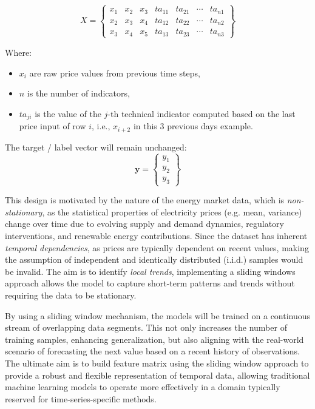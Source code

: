 \documentclass[12pt]{report} %
\begin{document}
\begin{equation*}
{X} = \begin{Bmatrix}
x_1 & x_2 & x_3 & ta_{11} & ta_{21} & \cdots & ta_{n1}\\
x_2 & x_3 & x_4 & ta_{12} & ta_{22} & \cdots & ta_{n2}\\
x_3 & x_4 & x_5 & ta_{13} & ta_{23} & \cdots & ta_{n3}
\end{Bmatrix}
\end{equation*}

Where:
\begin{itemize}
    \item $x_i$ are raw price values from previous time steps,
    \item $n$ is the number of indicators,
    \item $ta_{ji}$ is the value of the $j$-th technical indicator computed based on the last price input of row $i$, i.e., $x_{i+2}$ in this 3 previous days example.
\end{itemize}

The target / label vector will remain unchanged:
\begin{equation*}
\mathbf{y} = \begin{Bmatrix}
y_1 \\
y_2 \\
y_3
\end{Bmatrix}
\end{equation*}

This design is motivated by the nature of the energy market data, which is \textit{non-stationary}, as the statistical properties of electricity prices (e.g. mean, variance) change over time due to evolving supply and demand dynamics, regulatory interventions, and renewable energy contributions. Since the dataset has inherent \textit{temporal dependencies}, as prices are typically dependent on recent values, making the assumption of independent and identically distributed (i.i.d.) samples would be invalid. The aim is to identify \textit{local trends}, implementing a sliding windows approach allows the model to capture short-term patterns and trends without requiring the data to be stationary.

By using a sliding window mechanism, the models will be trained on a continuous stream of overlapping data segments. This not only increases the number of training samples, enhancing generalization, but also aligning with the real-world scenario of forecasting the next value based on a recent history of observations. The ultimate aim is to build feature matrix using the sliding window approach to provide a robust and flexible representation of temporal data, allowing traditional machine learning models to operate more effectively in a domain typically reserved for time-series-specific methods.
\end{document}
